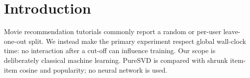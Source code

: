 \section{Introduction}
Movie recommendation tutorials commonly report a random or per-user
leave-one-out split. We instead make the primary experiment respect global
wall-clock time: no interaction after a cut-off can influence training.
Our scope is deliberately classical machine learning. PureSVD is compared
with shrunk item-item cosine and popularity; no neural network is used.
